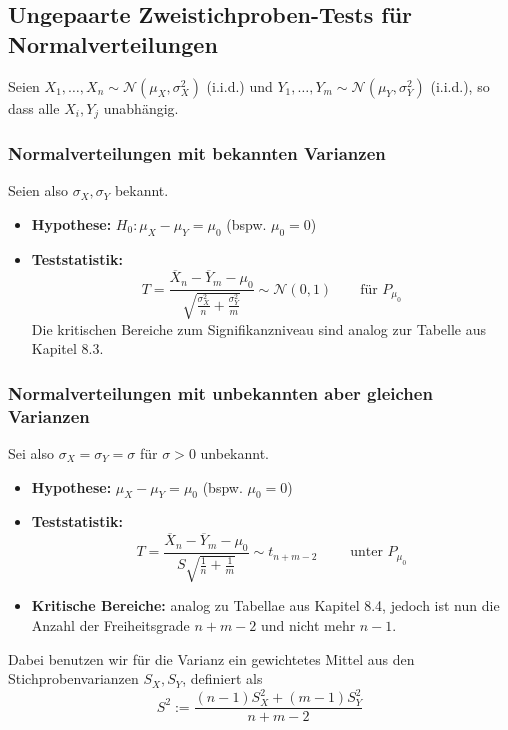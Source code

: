 \subsection{Ungepaarte Zweistichproben-Tests für Normalverteilungen}
Seien $X_1,\dots,X_n \sim \mathcal{N}(\mu_X, \sigma_X^2) $ (i.i.d.) und $Y_1,\dots,Y_m \sim \mathcal{N}(\mu_Y, \sigma_Y^2)$ (i.i.d.), so dass alle $X_i,Y_j$ unabhängig.
\subsubsection{Normalverteilungen mit bekannten Varianzen}
Seien also $\sigma_X, \sigma_Y$ bekannt.
\begin{itemize}
\item \textbf{Hypothese:} $H_0 : \mu_X - \mu_Y = \mu_0 $ (bspw. $\mu_0 = 0$)
\item \textbf{Teststatistik:} $$ T = \frac{\overline{X}_n - \overline{Y}_m - \mu_0}{\sqrt{\frac{\sigma_X^2}{n} + \frac{\sigma_Y^2}{m}}} \sim \mathcal{N}(0,1) \quad \quad \mbox{für } P_{\mu_0}$$
Die kritischen Bereiche zum Signifikanzniveau sind analog zur Tabelle aus Kapitel 8.3.
\end{itemize}
\subsubsection{Normalverteilungen mit unbekannten aber gleichen Varianzen}
Sei also $\sigma_X = \sigma_Y = \sigma$ für $\sigma >0$ unbekannt.
\begin{itemize}
\item \textbf{Hypothese:} $\mu_X - \mu_Y = \mu_0$ (bspw. $\mu_0 = 0$)
\item \textbf{Teststatistik:} $$ T = \frac{\overline{X}_n - \overline{Y}_m - \mu_0}{S \sqrt{\frac{1}{n}+\frac{1}{m}}} \sim t_{n+m-2} \quad \quad \mbox{ unter } P_{\mu_0} $$
\item \textbf{Kritische Bereiche:} analog zu Tabellae aus Kapitel 8.4, jedoch ist nun die Anzahl der Freiheitsgrade $n+m-2$ und nicht mehr $n-1$.
\end{itemize}
Dabei benutzen wir für die Varianz ein gewichtetes Mittel aus den Stichprobenvarianzen $S_X, S_Y$, definiert als
$$ S^2 := \frac{(n-1)S_X^2 + (m-1)S_Y^2}{n+m-2}$$
